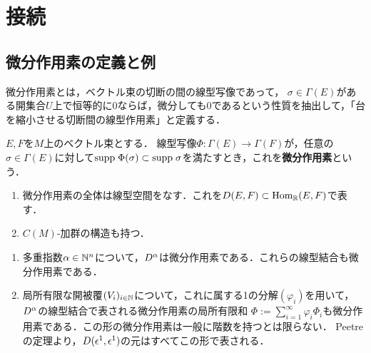\documentclass[uplatex,dvipdfmx]{jsreport}
\begin{document}
\section{接続}

\subsection{微分作用素の定義と例}

\begin{tcolorbox}[colframe=ForestGreen, colback=ForestGreen!10!white,breakable,colbacktitle=ForestGreen!40!white,coltitle=black,fonttitle=\bfseries\sffamily,
    title=]
    微分作用素とは，ベクトル束の切断の間の線型写像であって，
    $\sigma\in\Gamma(E)$がある開集合$U$上で恒等的に$0$ならば，微分しても$0$であるという性質を抽出して，「台を縮小させる切断間の線型作用素」と定義する．
\end{tcolorbox}

\begin{definition}
    $E,F$を$M$上のベクトル束とする．
    線型写像$\Phi:\Gamma(E)\to\Gamma(F)$が，任意の$\sigma\in\Gamma(E)$に対して$\mathrm{supp}\;\Phi(\sigma)\subset\mathrm{supp}\;\sigma$を満たすとき，これを\textbf{微分作用素}という．
\end{definition}

\begin{lemma}\mbox{}
    \begin{enumerate}
        \item 微分作用素の全体は線型空間をなす．これを$D(E,F)\subset\mathrm{Hom}_{\mathbb{R}}(E,F)$で表す．
        \item $C(M)$-加群の構造も持つ．
    \end{enumerate}
\end{lemma}

\begin{example}\mbox{}
    \begin{enumerate}
        \item 多重指数$\alpha\in\mathbb{N}^n$について，$D^\alpha$は微分作用素である．これらの線型結合も微分作用素である．
        \item 局所有限な開被覆$(V_i)_{i\in\mathbb{N}}$について，これに属する1の分解$(\varphi_i)$を用いて，$D^\alpha$の線型結合で表される微分作用素の局所有限和
        $\Phi:=\sum^\infty_{i=1}\varphi_i\Phi_i$も微分作用素である．この形の微分作用素は一般に階数を持つとは限らない．
        Peetreの定理より，$D(\epsilon^1,\epsilon^1)$の元はすべてこの形で表される．
    \end{enumerate}
\end{example}
\end{document}
